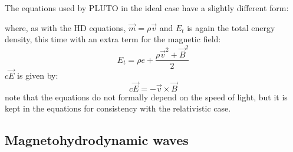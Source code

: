 The equations used by PLUTO in the ideal case have a slightly different form: 

{\centering 
\noindent {}
\par}

where, as with the HD equations, $\vec{m}=\rho\vec{v}$ and $E_t$ is again the total energy density, this time with an extra term for the magnetic field:
\begin{equation*}
	E_t = \rho e + \frac{\rho \vec{v}^2 + \vec{B}^2}{2}
\end{equation*}
$c\vec{E}$ is given by:
\begin{equation*}
	c\vec{E} = -\vec{v}\times \vec{B}
\end{equation*}
note that the equations do not formally depend on the speed of light, but it is kept in the equations for consistency with the relativistic case.
\subsection{Magnetohydrodynamic waves}








































